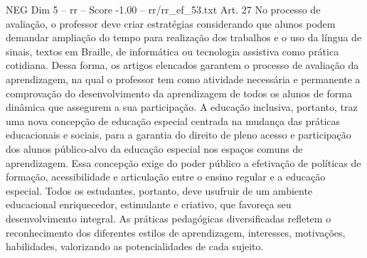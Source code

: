 \begin{textsample}{NEG Dim 5 – rr – Score -1.00 – rr/rr\_ef\_53.txt}
Art. 27 No processo de avaliação, o professor deve criar estratégias considerando que alunos podem demandar ampliação do tempo para realização dos trabalhos e o uso da língua de sinais, textos em Braille, de informática ou tecnologia assistiva como prática cotidiana.
Dessa forma, os artigos elencados garantem o processo de avaliação da aprendizagem, na qual o professor tem como atividade necessária e permanente a comprovação do desenvolvimento da aprendizagem de todos os alunos de forma dinâmica que assegurem a sua participação.
A educação inclusiva, portanto, traz uma nova concepção de educação especial centrada na mudança das práticas educacionais e sociais, para a garantia do direito de pleno acesso e participação dos alunos público-alvo da educação especial nos espaços comuns de aprendizagem.
Essa concepção exige do poder público a efetivação de políticas de formação, acessibilidade e articulação entre o ensino regular e a educação especial.
Todos os estudantes, portanto, deve usufruir de um ambiente educacional enriquecedor, estimulante e criativo, que favoreça seu desenvolvimento integral.
As práticas pedagógicas diversificadas refletem o reconhecimento dos diferentes estilos de aprendizagem, interesses, motivações, habilidades, valorizando as potencialidades de cada sujeito.

\end{textsample}
